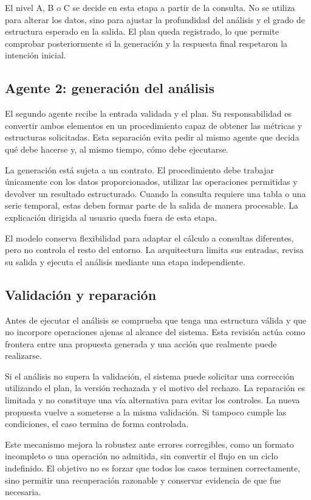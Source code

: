 El nivel A, B o C se decide en esta etapa a partir de la consulta. No se utiliza para alterar los datos, sino para ajustar la profundidad del análisis y el grado de estructura esperado en la salida. El plan queda registrado, lo que permite comprobar posteriormente si la generación y la respuesta final respetaron la intención inicial.

\subsection{Agente 2: generación del análisis}

El segundo agente recibe la entrada validada y el plan. Su responsabilidad es convertir ambos elementos en un procedimiento capaz de obtener las métricas y estructuras solicitadas. Esta separación evita pedir al mismo agente que decida qué debe hacerse y, al mismo tiempo, cómo debe ejecutarse.

La generación está sujeta a un contrato. El procedimiento debe trabajar únicamente con los datos proporcionados, utilizar las operaciones permitidas y devolver un resultado estructurado. Cuando la consulta requiere una tabla o una serie temporal, estas deben formar parte de la salida de manera procesable. La explicación dirigida al usuario queda fuera de esta etapa.

El modelo conserva flexibilidad para adaptar el cálculo a consultas diferentes, pero no controla el resto del entorno. La arquitectura limita sus entradas, revisa su salida y ejecuta el análisis mediante una etapa independiente.

\subsection{Validación y reparación}

Antes de ejecutar el análisis se comprueba que tenga una estructura válida y que no incorpore operaciones ajenas al alcance del sistema. Esta revisión actúa como frontera entre una propuesta generada y una acción que realmente puede realizarse.

Si el análisis no supera la validación, el sistema puede solicitar una corrección utilizando el plan, la versión rechazada y el motivo del rechazo. La reparación es limitada y no constituye una vía alternativa para evitar los controles. La nueva propuesta vuelve a someterse a la misma validación. Si tampoco cumple las condiciones, el caso termina de forma controlada.

Este mecanismo mejora la robustez ante errores corregibles, como un formato incompleto o una operación no admitida, sin convertir el flujo en un ciclo indefinido. El objetivo no es forzar que todos los casos terminen correctamente, sino permitir una recuperación razonable y conservar evidencia de que fue necesaria.

